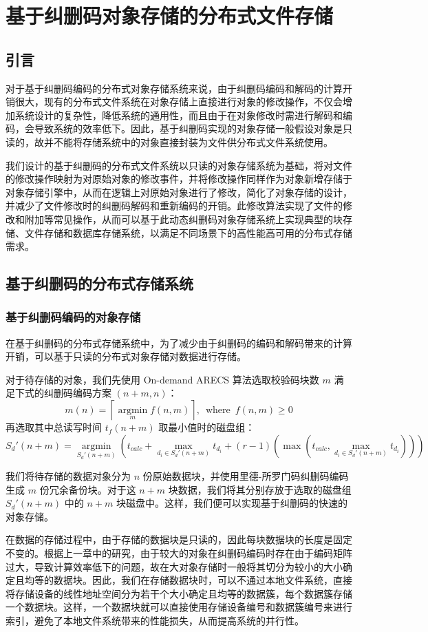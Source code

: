 \chapter{基于纠删码对象存储的分布式文件存储}
\section{引言}
对于基于纠删码编码的分布式对象存储系统来说，由于纠删码编码和解码的计算开销很大，现有的分布式文件系统在对象存储上直接进行对象的修改操作，不仅会增加系统设计的复杂性，降低系统的通用性，而且由于在对象修改时需进行解码和编码，会导致系统的效率低下。因此，基于纠删码实现的对象存储一般假设对象是只读的，故并不能将存储系统中的对象直接封装为文件供分布式文件系统使用。

我们设计的基于纠删码的分布式文件系统以只读的对象存储系统为基础，将对文件的修改操作映射为对原始对象的修改事件，并将修改操作同样作为对象新增存储于对象存储引擎中，从而在逻辑上对原始对象进行了修改，简化了对象存储的设计，并减少了文件修改时的纠删码解码和重新编码的开销。此修改算法实现了文件的修改和附加等常见操作，从而可以基于此动态纠删码对象存储系统上实现典型的块存储、文件存储和数据库存储系统，以满足不同场景下的高性能高可用的分布式存储需求。
\section{基于纠删码的分布式存储系统}
\subsection{基于纠删码编码的对象存储}
在基于纠删码的分布式存储系统中，为了减少由于纠删码的编码和解码带来的计算开销，可以基于只读的分布式对象存储对数据进行存储。

对于待存储的对象，我们先使用 On-demand ARECS 算法选取校验码块数 $m$ 满足下式的纠删码编码方案 $(n+m,n)$：
$$
m(n)=\left\lceil\operatorname*{argmin}_{m}f(n,m)\right\rceil,\ \operatorname*{where}\ f(n,m) \geq 0
$$
再选取其中总读写时间 $t_{f}(n+m)$ 取最小值时的磁盘组：
$$
S_{d}'(n+m)=\operatorname*{argmin}_{S_{d}'(n+m)}\left(t_{calc}+\max_{d_{i}{\in}S_{d}'(n+m)}t_{d_i}+(r-1)\left(\max\left(t_{calc},\max_{d_{i}{\in}S_{d}'(n+m)}t_{d_i}\right)\right)\right)
$$

我们将待存储的数据对象分为 $n$ 份原始数据块，并使用里德-所罗门码纠删码编码生成 $m$ 份冗余备份块。对于这 $n+m$ 块数据，我们将其分别存放于选取的磁盘组 $S_{d}'(n+m)$ 中的 $n+m$ 块磁盘中。这样，我们便可以实现基于纠删码的快速的对象存储。

在数据的存储过程中，由于存储的数据块是只读的，因此每块数据块的长度是固定不变的。根据上一章中的研究，由于较大的对象在纠删码编码时存在由于编码矩阵过大，导致计算效率低下的问题，故在大对象存储时一般将其切分为较小的大小确定且均等的数据块。因此，我们在存储数据块时，可以不通过本地文件系统，直接将存储设备的线性地址空间分为若干个大小确定且均等的数据簇，每个数据簇存储一个数据块。这样，一个数据块就可以直接使用存储设备编号和数据簇编号来进行索引，避免了本地文件系统带来的性能损失，从而提高系统的并行性。
